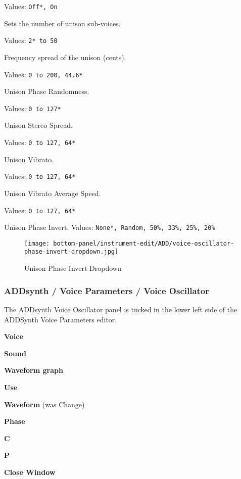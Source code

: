    Values: \texttt{Off*, On}

   Sets the number of unison sub-voices.

   Values: \texttt{2* to 50}

   Frequency spread of the unison (cents).

   Values: \texttt{0 to 200, 44.6*}

   Unison Phase Randomness.

   Values: \texttt{0 to 127*}

   Unison Stereo Spread.

   Values: \texttt{0 to 127, 64*}

   Unison Vibrato.

   Values: \texttt{0 to 127, 64*}

   Unison Vibrato Average Speed.

   Values: \texttt{0 to 127, 64*}

   Unison Phase Invert.
   Values: \texttt{None*, Random, 50\%, 33\%, 25\%, 20\%}

\begin{figure}[H]
   \centering
   \texttt{[image: bottom-panel/instrument-edit/ADD/voice-oscillator-phase-invert-dropdown.jpg]}
   \caption{Unison Phase Invert Dropdown}
   \label{fig:phase_invert_dropdown}
\end{figure}


\subsubsection{ADDsynth / Voice Parameters / Voice Oscillator}
\label{subsubsec:addsynth_voice_parameters_oscillator}

   The ADDsynth Voice Oscillator panel is tucked in the lower left side of the
   ADDSynth Voice Parameters editor.

   \begin{enumber}
     \item \textbf{Voice}
      \item \textbf{Sound}
      \item \textbf{Waveform graph}
      \item \textbf{Use}
      \item \textbf{Waveform} (was Change)
      \item \textbf{Phase}
      \item \textbf{C}
      \item \textbf{P}
      \item \textbf{Close Window}
   \end{enumber}


